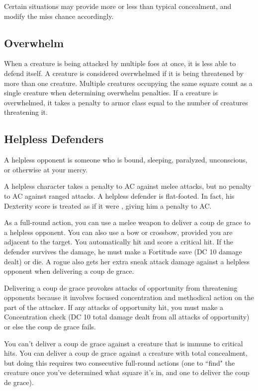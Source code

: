  Certain situations may provide more or less than typical concealment, and modify the miss chance accordingly.

\subsection{Overwhelm}
When a creature is being attacked by multiple foes at once, it is less able to defend itself. A creature is considered overwhelmed if it is being threatened by more than one creature. Multiple creatures occupying the same square count as a single creature when determining overwhelm penalties. If a creature is overwhelmed, it takes a penalty to armor class equal to the number of creatures threatening it.

\subsection{Helpless Defenders}
A helpless opponent is someone who is bound, sleeping, paralyzed, unconscious, or otherwise at your mercy.

 A helpless character takes a  penalty to AC against melee attacks, but no penalty to AC against ranged attacks. A helpless defender is flat-footed. In fact, his Dexterity score is treated as if it were , giving him a  penalty to AC.

 As a full-round action, you can use a melee weapon to deliver a coup de grace to a helpless opponent. You can also use a bow or crossbow, provided you are adjacent to the target. You automatically hit and score a critical hit. If the defender survives the damage, he must make a Fortitude save (DC 10 \add damage dealt) or die. A rogue also gets her extra sneak attack damage against a helpless opponent when delivering a coup de grace.

Delivering a coup de grace provokes attacks of opportunity from
threatening opponents because it involves focused concentration
and methodical action on the part of the attacker. If any attacks of opportunity hit, you must make a Concentration check (DC 10 \add total damage dealt from all attacks of opportunity) or else the coup de grace fails.

You can't deliver a coup de grace against a creature that is immune to critical hits. You can deliver a coup de grace against a creature with total concealment, but doing this requires two consecutive full-round actions (one to ``find" the creature once you've determined what square it's in, and one to deliver the coup de grace).

